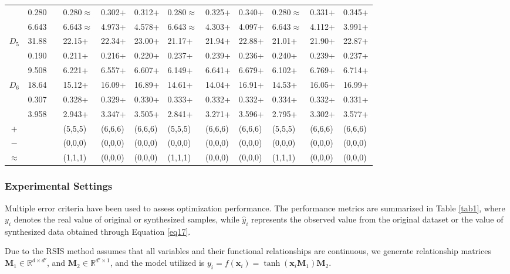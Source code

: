 \documentclass[lettersize,journal]{IEEEtran}
\begin{document}
\begin{table}[]
\begin{tabularx}{\textwidth}{cccXXXXXXXXX}
    & 0.280 &  & 0.280$\approx$ & 0.302+ & 0.312+ & 0.280$\approx$ & 0.325+ & 0.340+ & 0.280$\approx$ & 0.331+ & 0.345+ \\
    & 6.643 &  & 6.643$\approx$ & 4.973+ & 4.578+ & 6.643$\approx$ & 4.303+ & 4.097+ & 6.643$\approx$ & 4.112+ & 3.991+ \\
  \hline
  \multirow{3}{*}{$D_5$} & 31.88 &  & 22.15+ & 22.34+ & 23.00+ & 21.17+ & 21.94+ & 22.88+ & 21.01+ & 21.90+ & 22.87+ \\
    & 0.190 &  & 0.211+ & 0.216+ & 0.220+ & 0.237+ & 0.239+ & 0.236+ & 0.240+ & 0.239+ & 0.237+ \\
    & 9.508 &  & 6.221+ & 6.557+ & 6.607+ & 6.149+ & 6.641+ & 6.679+ & 6.102+ & 6.769+ & 6.714+ \\
  \hline
  \multirow{3}{*}{$D_6$} & 18.64 &  & 15.12+ & 16.09+ & 16.89+ & 14.61+ & 14.04+ & 16.91+ & 14.53+ & 16.05+ & 16.99+ \\
    & 0.307 &  & 0.328+ & 0.329+ & 0.330+ & 0.333+ & 0.332+ & 0.332+ & 0.334+ & 0.332+ & 0.331+ \\
    & 3.958 &  & 2.943+ & 3.347+ & 3.505+ & 2.841+ & 3.271+ & 3.596+ & 2.795+ & 3.302+ & 3.577+ \\
  \hline
  $+$ &  &  & (5,5,5) & (6,6,6) & (6,6,6) & (5,5,5) & (6,6,6) & (6,6,6) & (5,5,5) & (6,6,6) & (6,6,6) \\
  $-$ &  &  & (0,0,0) & (0,0,0) & (0,0,0) & (0,0,0) & (0,0,0) & (0,0,0) & (0,0,0) & (0,0,0) & (0,0,0) \\
  $\approx$ &  &  & (1,1,1) & (0,0,0) & (0,0,0) & (1,1,1) & (0,0,0) & (0,0,0) & (1,1,1) & (0,0,0) & (0,0,0) \\

  \bottomrule
  \end{tabularx}
\end{table}

\subsubsection{Experimental Settings}
Multiple error criteria have been used to assess optimization 
performance. The performance metrics are summarized in Table \ref{tab1}, 
where $y_i$ denotes the real value of original or synthesized 
samples, while $\hat{y}_i$ represents the observed value from the 
original dataset or the value of synthesized data obtained through 
Equation \eqref{eq17}.

Due to the RSIS method assumes that all variables and their 
functional relationships are continuous, we generate relationship 
matrices $\boldsymbol{M}_1\in\mathbb{R}^{d\times{d'}}$, and 
$\boldsymbol{M}_2\in\mathbb{R}^{d'\times{1}}$, and the model 
utilized is $y_i = f(\boldsymbol{x}_i) = \tanh(\boldsymbol{x}_i 
\boldsymbol{M}_1)\boldsymbol{M}_2$. 
\end{document}
